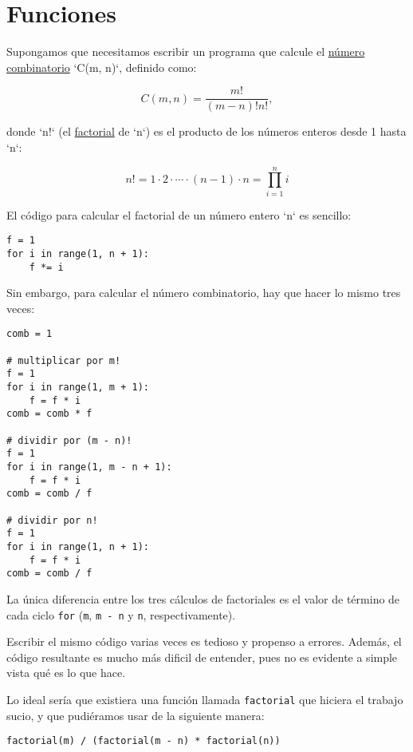 \section{Funciones}

Supongamos que necesitamos escribir un programa que calcule el
\href{http://es.wikipedia.org/wiki/Número\_combinatorio}{número
combinatorio} `C(m, n)`, definido como:

\[C(m, n) = \frac{m!}{(m - n)! n!},\]

donde `n!` (el \href{http://es.wikipedia.org/wiki/Factorial}{factorial}
de `n`) es el producto de los números enteros desde 1 hasta `n`:

\[n! = 1\cdot 2\cdot\cdots\cdot(n - 1)\cdot n = \prod_{i=1}^n i\]

El código para calcular el factorial de un número entero `n` es
sencillo:

\begin{lstlisting}
f = 1
for i in range(1, n + 1):
    f *= i
\end{lstlisting}

Sin embargo, para calcular el número combinatorio, hay que hacer lo
mismo tres veces:

\begin{lstlisting}
comb = 1

# multiplicar por m!
f = 1
for i in range(1, m + 1):
    f = f * i
comb = comb * f

# dividir por (m - n)!
f = 1
for i in range(1, m - n + 1):
    f = f * i
comb = comb / f

# dividir por n!
f = 1
for i in range(1, n + 1):
    f = f * i
comb = comb / f
\end{lstlisting}

La única diferencia entre los tres cálculos de factoriales es el valor
de término de cada ciclo \lstinline!for! (\lstinline!m!,
\lstinline!m - n! y \lstinline!n!, respectivamente).

Escribir el mismo código varias veces es tedioso y propenso a errores.
Además, el código resultante es mucho más dificil de entender, pues no
es evidente a simple vista qué es lo que hace.

Lo ideal sería que existiera una función llamada \lstinline!factorial!
que hiciera el trabajo sucio, y que pudiéramos usar de la siguiente
manera:

\begin{lstlisting}
factorial(m) / (factorial(m - n) * factorial(n))
\end{lstlisting}


